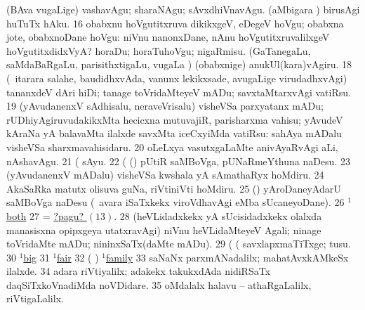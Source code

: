  (BAva \mo vugaLige) vashavAgu; sharaNAgu; sAvxdhiVnavAgu. 
 (aMbigara \vi) birusAgi huTuTx hAku. 
\eanum
\numie
\num{16}  obabxnu hoVgutitxruva dikikxgeV, eDegeV hoVgu; obabxna jote, obabxnoDane hoVgu:  niVnu nanonxDane, nAnu hoVgutitxruvalilxgeV hoVgutitxdidxVyA? 
  
\banum
{} horaDu; horaTuhoVgu; nigaRmisu. 
 (GaTanegaLu, saMdaBaRgaLu, parisithxtigaLu, \mo vugaLa \vi) (obabxnige) anukUl(kara)vAgiru. 
\eanum
\numie
\num{18}  (\kanmu\ itarara salahe, baudidhxvAda, \mo vanunx lekikxsade, avugaLige virudadhxvAgi) tananxdeV dAri hiDi; tanage toVridaMteyeV mADu; savxtaMtarxvAgi vatiRsu. 
\num{19}  (yAvudanenxV sAdhisalu, neraveVrisalu) visheVSa parxyatanx mADu; rUDhiyAgiruvudakikxMta hecicxna mutuvajiR, parisharxma vahisu; yAvudeV kAraNa yA balavaMta ilalxde savxMta iceCxyiMda vatiRsu:  sahAya mADalu visheVSa sharxmavahisidaru. 
\num{20}  oLeLxya vasutxgaLaMte anivAyaRvAgi aLi, nAshavAgu. 
\num{21}  (    sAyu. 
\num{22}  (  (\AmA) pUtiR saMBoVga, pUNaRmeYthuna naDesu. 
\num{23}  (yAvudanenxV mADalu) visheVSa kwshala yA sAmathaRyx hoMdiru. 
\num{24}  AkaSaRka matutx olisuva guNa, riVtiniVti hoMdiru. 
\num{25}  (\hA) yAroDaneyAdarU saMBoVga naDesu (\kanmu\ avara iSaTxkekx viroVdhavAgi eMba sUcaneyoDane). 
\num{26}  \hyperref{kandict_b.pdf}{B}{both(1) nuga(2)}{$^1$both}  
\num{27}  = \hyperlink{way pagu13}{?pagu? \((13)\)}. 
\num{28}  (heVLidadxkekx yA sUcisidadxkekx olalxda manasisxna opipxgeya utatxravAgi) niVnu heVLidaMteyeV Agali; ninage toVridaMte mADu; nininxSaTx(daMte mADu). 
\num{29}  (  (  savxlapxmaTiTxge; tusu. 
\num{30}  \hyperref{kandict_b.pdf}{B}{big(1) nuga(3)}{$^1$big}  
\num{31}  \hyperref{kandict_f.pdf}{F}{fair(1) nuga(8)}{$^1$fair}  
\num{32}  ( ) \hyperref{kandict_f.pdf}{F}{family(1) nuga(1)}{$^1$family}  
\num{33}  saNaNx parxmANadalilx; mahatAvxkAMkeSx ilalxde. 
\num{34}  adara riVtiyalilx; adakekx takukxdAda nidiRSaTx daqSiTxkoVnadiMda noVDidare. 
\num{35}  oMdalalx halavu -- athaRgaLalilx, riVtigaLalilx. 
